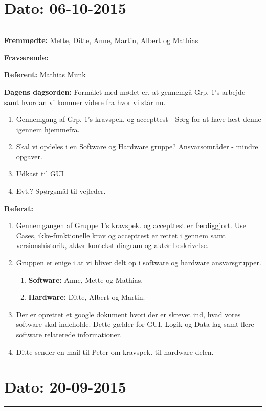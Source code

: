 \section{Dato: 06-10-2015}
\hrule

\textbf{Fremmødte:} Mette, Ditte, Anne, Martin, Albert og Mathias 

\textbf{Fraværende:}

\textbf{Referent:} Mathias Munk

\textbf{Dagens dagsorden:}
\newline
Formålet med mødet er, at gennemgå Grp. 1's arbejde samt hvordan vi kommer videre fra hvor vi står nu.
\begin{enumerate}
\item Gennemgang af Grp. 1's kravspek. og accepttest - Sørg for at have læst denne igennem hjemmefra.

\item Skal vi opdeles i en Software og Hardware gruppe? Ansvarsområder - mindre opgaver.

\item Udkast til GUI

\item Evt.? Spørgsmål til vejleder.
\end{enumerate}

\textbf{Referat:}
\newline 
\begin{enumerate}
\item Gennemgangen af Gruppe 1's kravspek. og accepttest er færdiggjort. Use Cases, ikke-funktionelle krav og accepttest er rettet i gennem samt versionshistorik, aktør-kontekst diagram og aktør beskrivelse. 
\item Gruppen er enige i at vi bliver delt op i	software og hardware ansvarsgrupper.
\begin{enumerate}
\item \textbf{Software: } Anne, Mette og Mathias.
\item \textbf{Hardware: } Ditte, Albert og Martin.
\end{enumerate}
\item Der er oprettet et google dokument hvori der er skrevet ind, hvad vores software skal indeholde. Dette gælder for GUI, Logik og Data lag samt flere software relaterede informationer.
\item Ditte sender en mail til Peter om kravspek. til hardware delen.
\end{enumerate}

\section{Dato: 20-09-2015}
\hrule

